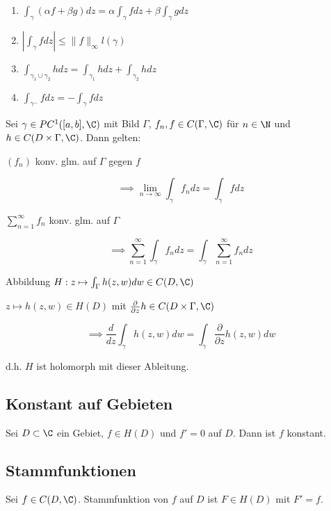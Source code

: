 \begin{enumerate}[label=(\alph*)]
	\item \(\int_\gamma (\alpha f + \beta g) dz = \alpha \int_\gamma f dz + \beta \int_\gamma g dz\)
	\item \(|\int_\gamma f dz| \leq \|f\|_\infty l(\gamma)\)
	\item \(\int_{\gamma_1 \cup \gamma_2} h dz = \int_{\gamma_1} h dz + \int_{\gamma_2} h dz\)
	\item \(\int_{\gamma^-} f dz = - \int_{\gamma} f dz\)
\end{enumerate}

Sei \(\gamma \in PC^1([a,b],\C)\) mit Bild \(\Gamma\), \(f_n, f \in C(\Gamma,\C)\) für \(n \in \N\) und \(h \in C(D\times\Gamma,\C)\). Dann gelten:

\spacing

\((f_n)\) konv. glm. auf \(\Gamma\) gegen \(f\)

\vspace*{-2mm}
\[ \implies \displaystyle\lim_{n\to\infty} \int_\gamma f_n dz = \int_\gamma f dz \]

\(\sum_{n=1}^\infty f_n\) konv. glm. auf \(\Gamma\)

\vspace*{-2mm}
\[ \implies \displaystyle\sum_{n=1}^\infty \int_\gamma f_n dz = \int_\gamma \displaystyle\sum_{n=1}^\infty f_n dz \]

Abbildung \(H : z \mapsto \int_\Gamma h(z,w) dw \in C(D,\C)\)

	\(z \mapsto h(z,w) \in H(D)\) mit \(\frac{\partial}{\partial z} h \in C(D \times \Gamma, \C)\)

\vspace*{-2mm}
\[ \implies \frac{d}{dz} \int_\gamma h(z,w) dw = \int_\gamma \frac{\partial}{\partial z} h(z,w) dw \]

d.h. \(H\) ist holomorph mit dieser Ableitung.

\subsection*{Konstant auf Gebieten}

Sei \(D \subset \C\) ein Gebiet, \(f \in H(D)\) und \(f'=0\) auf \(D\). Dann ist \(f\) konstant.

\subsection*{Stammfunktionen}

Sei \(f \in C(D,\C)\). Stammfunktion von \(f\) auf \(D\) ist \(F \in H(D)\) mit \(F'=f\).

